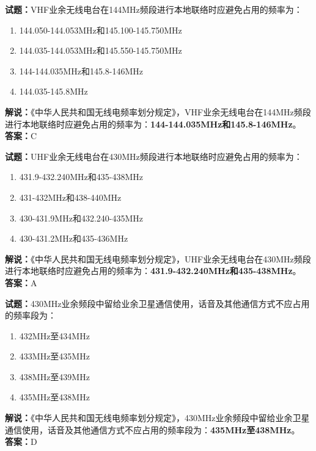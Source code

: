 \documentclass{ctexbook}
\begin{document}
\bigskip


\noindent\textbf{试题：}VHF业余无线电台在144MHz频段进行本地联络时应避免占用的频率为：
\begin{enumerate}[leftmargin=3em]
	\item 144.050-144.053MHz和145.100-145.750MHz
	\item 144.035-144.053MHz和145.550-145.750MHz
	\item 144-144.035MHz和145.8-146MHz
	\item 144.035-145.8MHz
\end{enumerate}
\noindent\textbf{解说：}《中华人民共和国无线电频率划分规定》，VHF业余无线电台在144MHz频段进行本地联络时应避免占用的频率为：\textbf{144-144.035MHz和145.8-146MHz}。\\\noindent\textbf{答案：}C



\bigskip


\noindent\textbf{试题：}UHF业余无线电台在430MHz频段进行本地联络时应避免占用的频率为：
\begin{enumerate}[leftmargin=3em]
	\item 431.9-432.240MHz和435-438MHz
	\item 431-432MHz和438-440MHz
	\item 430-431.9MHz和432.240-435MHz
	\item 430-431.2MHz和435-436MHz
\end{enumerate}
\noindent\textbf{解说：}《中华人民共和国无线电频率划分规定》，UHF业余无线电台在430MHz频段进行本地联络时应避免占用的频率为：\textbf{431.9-432.240MHz和435-438MHz}。\\\noindent\textbf{答案：}A



\bigskip


\noindent\textbf{试题：}430MHz业余频段中留给业余卫星通信使用，话音及其他通信方式不应占用的频率段为：
\begin{enumerate}[leftmargin=3em]
	\item 432MHz至434MHz
	\item 433MHz至435MHz
	\item 438MHz至439MHz
	\item 435MHz至438MHz
\end{enumerate}
\noindent\textbf{解说：}《中华人民共和国无线电频率划分规定》，430MHz业余频段中留给业余卫星通信使用，话音及其他通信方式不应占用的频率段为：\textbf{435MHz至438MHz}。\\\noindent\textbf{答案：}D
\end{document}
